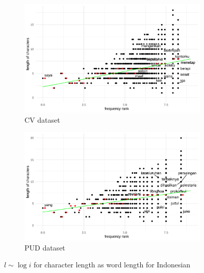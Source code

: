 \begin{figure}[H]
  \centering
  \begin{subfigure}[b]{0.48\textwidth}
    \centering
    \includegraphics[width=\textwidth]{plots/Indonesian_logi_cl_CV.pdf}
    \caption{CV dataset}
  \end{subfigure}
  \hfill
  \begin{subfigure}[b]{0.48\textwidth}
    \centering
    \includegraphics[width=\textwidth]{plots/Indonesian_logi_cl_PUD.pdf}
    \caption{PUD dataset}
  \end{subfigure}
  \caption{$l \sim \log i$ for character length as word length for Indonesian}
\end{figure}
